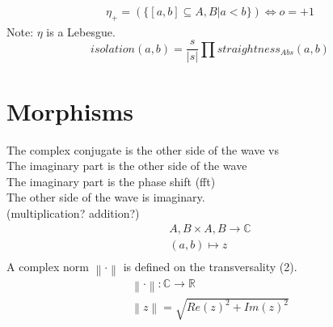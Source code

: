 \documentclass{report}
\newcommand\norm[1]{\left\lVert#1\right\rVert}
\begin{document}
\begin{align}
\eta_{+}=(\{[a,b] \subseteq A,B \vert a<b\}) \Leftrightarrow o=+1
\end{align}
Note: $\eta$ is a Lebesgue.
\begin{equation}
isolation(a,b)=\frac{s}{\lvert s \rvert} \prod straightness_{Abs}(a,b)
\end{equation}

\chapter{Morphisms}

The complex conjugate is the other side of the wave vs\\
The imaginary part is the other side of the wave\\
The imaginary part is the phase shift (fft)\\
The other side of the wave is imaginary.\\
(multiplication? addition?)
\begin{align}
A,B \times A,B \rightarrow \mathbb{C}\\
(a,b) \mapsto z\\
\end{align}
A complex norm $\norm{\cdot}$ is defined on the transversality (2).
\begin{align}
\norm{\cdot} : \mathbb{C} \rightarrow \mathbb{R}\\
\norm{z} = \sqrt{Re(z)^2+Im(z)^2}
\end{align}
\end{document}
